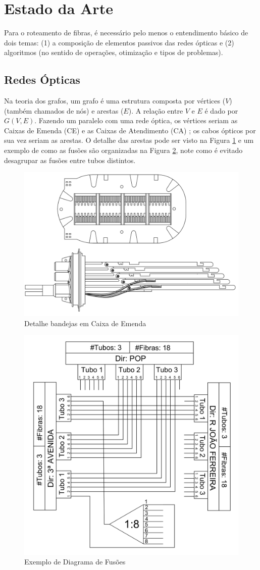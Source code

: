 \section{Estado da Arte} \label{sec:fundaments}

Para o roteamento de fibras, é necessário pelo menos o entendimento básico de
dois temas: (1) a composição de elementos passivos das redes ópticas e (2)
algoritmos (no sentido de operações, otimização e tipos de problemas).

\subsection{Redes Ópticas}

Na teoria dos grafos, um grafo é uma estrutura composta por vértices ($V$)
(também chamados de nós) e arestas ($E$). A relação entre $V$ e $E$ é dado por
$G(V,E)$. Fazendo um paralelo com uma rede óptica, os vértices seriam as Caixas
de Emenda (CE) e as Caixas de Atendimento (CA) \cite{maeda2009optical}; os
cabos ópticos por sua vez seriam as arestas. O detalhe das arestas pode ser
visto na Figura \ref{fig:ce_detalhe_bandejas} e um exemplo de como as fusões
são organizadas na Figura \ref{fig:diagrama_fusoes}, note como é evitado
desagrupar as fusões entre tubos distintos.

\begin{figure}
  \centering
	\includegraphics[width=.55\textwidth]{./images/caixa_emenda_detalhe_bandejas.png}
	\caption{Detalhe bandejas em Caixa de Emenda}
	\label{fig:ce_detalhe_bandejas}
\end{figure}

\begin{figure}[ht]
  \centering
	\includegraphics[width=.55\textwidth]{./images/diagrama_fusoes.png}
	\caption{Exemplo de Diagrama de Fusões}
	\label{fig:diagrama_fusoes}
\end{figure}

